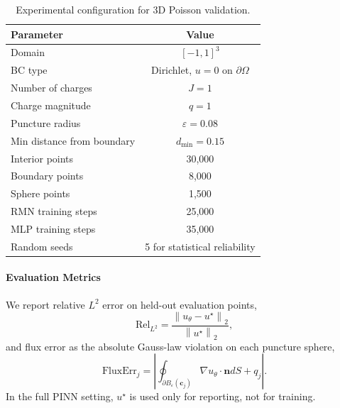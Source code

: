 \documentclass[twoside,11pt]{article}
\newcommand{\bc}{\bm{c}}
\newcommand{\norm}[1]{\left\|#1\right\|}
\begin{document}
\begin{table}[t]
	\centering
	\begin{tabular}{lc}
		\toprule
		Parameter                  & Value                                  \\
		\midrule
		Domain                     & $[-1, 1]^3$                            \\
		BC type                    & Dirichlet, $u = 0$ on $\partial\Omega$ \\
		Number of charges          & $J = 1$                                \\
		Charge magnitude           & $q = 1$                                \\
		Puncture radius            & $\varepsilon = 0.08$                   \\
		Min distance from boundary & $d_{\min} = 0.15$                      \\
		\midrule
		Interior points            & 30,000                                 \\
		Boundary points            & 8,000                                  \\
		Sphere points              & 1,500                                  \\
		\midrule
		RMN training steps         & 25,000                                 \\
		MLP training steps         & 35,000                                 \\
		Random seeds               & 5 for statistical reliability          \\
		\bottomrule
	\end{tabular}
	\caption{Experimental configuration for 3D Poisson validation.}
	\label{tab:exp3d_config}

\end{table}

\paragraph{Evaluation Metrics}

We report relative $L^2$ error on held-out evaluation points,
\begin{equation}
	\mathrm{Rel}_{L^2} = \frac{\norm{u_\theta - u^\star}_2}{\norm{u^\star}_2},
\end{equation}
and flux error as the absolute Gauss-law violation on each puncture sphere,
\begin{equation}
	\mathrm{FluxErr}_j = \left|\oint_{\partial B_\varepsilon(\bc_j)} \nabla u_\theta \cdot \mathbf{n} dS + q_j\right|.
\end{equation}
In the full PINN setting, $u^\star$ is used only for reporting, not for training.
\end{document}
